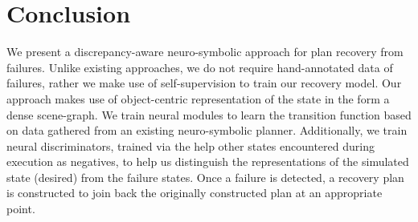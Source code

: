 \section{Conclusion}\label{sec:conclusion}
We present a discrepancy-aware neuro-symbolic approach for plan recovery from failures. Unlike existing approaches, we do not require hand-annotated data of failures, rather we make use of self-supervision to train our recovery model. %
Our approach makes use of object-centric representation of the state in the form a dense scene-graph. We train neural modules to learn the transition function based on data gathered from an existing neuro-symbolic planner. Additionally, we train neural discriminators, trained via the help other states encountered during execution as negatives, to help us distinguish the representations of the simulated state (desired) from the failure states. Once a failure is detected, a recovery plan is constructed to join back the originally constructed plan at an appropriate point. 
